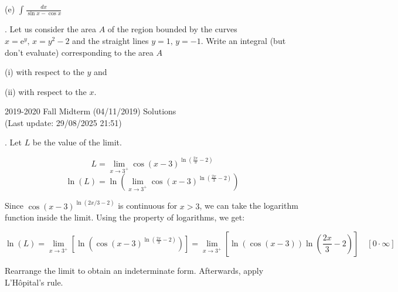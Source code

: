 \documentclass{article}
\begin{document}
\hfill

\noindent (e) $\displaystyle\int\frac{dx}{\sin x-\cos x}$

\hfill

\hfill

. Let us consider the area $A$ of the region bounded by the curves $x=\mathrm{e}^y,\,x=y^2-2$ and the straight lines $y=1,\,y=-1$. Write an integral (but don't evaluate) corresponding to the area $A$

\hfill

\noindent (i) with respect to the $y$ and

\noindent (ii) with respect to the $x$.

\newpage

\begin{center}
2019-2020 Fall Midterm (04/11/2019) Solutions\\
(Last update: 29/08/2025 21:51)
\end{center}

. Let $L$ be the value of the limit.

\[L = \lim_{x\to3^+}\cos(x-3)^{\ln\left(\frac{2x}{3}-2\right)}\]
\[\ln(L) =\ln\left( \lim_{x\to3^+}\cos(x-3)^{\ln\left(\frac{2x}{3}-2\right)}\right)\]

\hfill

\noindent Since $\cos(x-3)^{\ln(2x/3 -2)}$ is continuous for $x>3$, we can take the logarithm function inside the limit. Using the property of logarithms, we get:

\[\ln(L) =\lim_{x\to3^+}\left[ \ln\left(\cos(x-3)^{\ln\left(\frac{2x}{3}-2\right)}\right)\right] = \lim_{x\to3^+}\left[ \ln\left(\cos(x-3)\right)\ln\left(\frac{2x}{3}-2\right)\right]\quad[0 \cdot \infty]\]

\hfill

\noindent Rearrange the limit to obtain an indeterminate form. Afterwards, apply L'Hôpital's rule.
\end{document}
